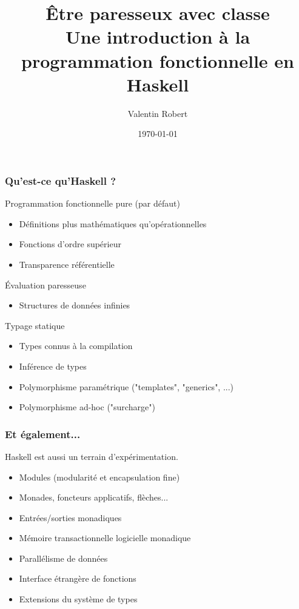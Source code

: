 \documentclass[10pt]{beamer}
\title[Haskell]{Être paresseux avec classe\\
Une introduction à la programmation fonctionnelle en Haskell}
\author{Valentin Robert}
\institute{INRIA}
\date{\today}
\begin{document}
\begin{frame}
\titlepage
\end{frame}



\begin{frame}
\frametitle{Qu'est-ce qu'Haskell ?}

\begin{block}
{Programmation fonctionnelle pure (par défaut)}
\begin{itemize}
\item Définitions plus mathématiques qu'opérationnelles
\item Fonctions d'ordre supérieur
\item Transparence référentielle
\end{itemize}
\end{block}

\begin{block}
{Évaluation paresseuse}
\begin{itemize}
\item Structures de données infinies
\end{itemize}
\end{block}

\begin{block}
{Typage statique}
\begin{itemize}
\item Types connus à la compilation
\item Inférence de types
\item Polymorphisme paramétrique ("templates", "generics", ...)
\item Polymorphisme ad-hoc ("surcharge")
\end{itemize}
\end{block}
\end{frame}



\begin{frame}
\frametitle{Et également...}

Haskell est aussi un terrain d'expérimentation.

\begin{itemize}
\item Modules (modularité et encapsulation fine)
\item Monades, foncteurs applicatifs, flèches...
\item Entrées/sorties monadiques
\item Mémoire transactionnelle logicielle monadique
\item Parallélisme de données
\item Interface étrangère de fonctions
\item Extensions du système de types
\end{itemize}
\end{frame}
\end{document}
